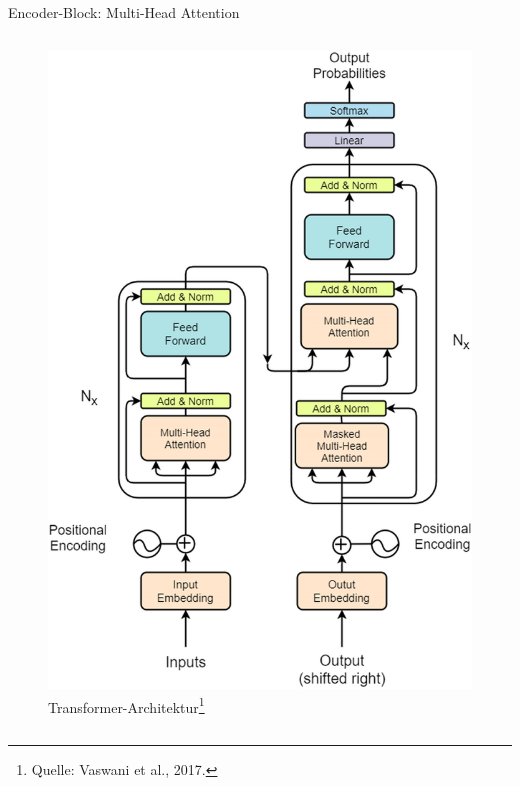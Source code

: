 \documentclass[aspectratio=1610, xcolor=dvipsnames, 9pt]{beamer}
\begin{document}
\begin{frame}{Encoder-Block: Multi-Head Attention}
\begin{columns}
\begin{column}{0.3\textwidth}
\begin{figure}
        \includegraphics[width=0.9\columnwidth]{images/Transformer-architecture-figure-sourced-from-original-paper-26.png}
        \caption{Transformer-Architektur\footnote{Quelle: Vaswani et al., 2017.}}
      \end{figure}
    \end{column}
  \end{columns}
\end{frame}
\end{document}
